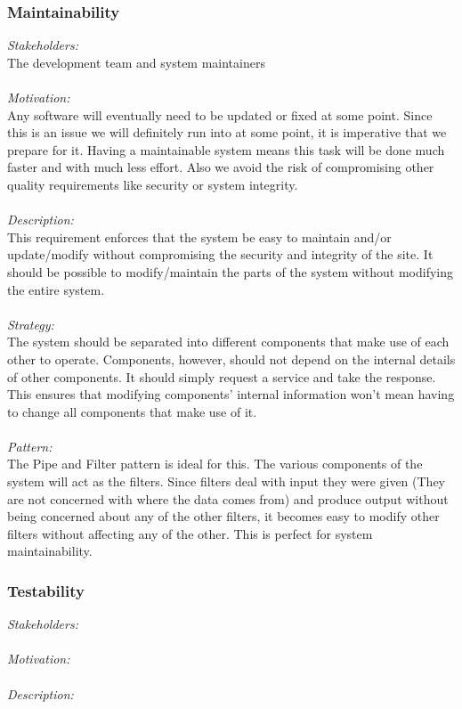 \documentclass[a4paper,12pt]{report}
\begin{document}
		\subsubsection{Maintainability}
		\emph{Stakeholders: }\\ The development team and system maintainers \\ 
		\\\emph{Motivation: }\\ Any software will eventually need to be updated or fixed at some point. Since this is an issue we will definitely run into at some point, it is imperative that we prepare for it. Having a maintainable system means this task will be done much faster and with much less effort. Also we avoid the risk of compromising other quality requirements like security or system integrity. \\ 
		\\\emph{Description: }\\ This requirement enforces that the system be easy to maintain and/or update/modify without compromising the security and integrity of the site. It should be possible to modify/maintain the parts of the system without modifying the entire system. \\ 
		\\\emph{Strategy: }\\ The system should be separated into different components that make use of each other to operate. Components, however, should not depend on the internal details of other components. It should simply request a service and take the response. This ensures that modifying components’ internal information won’t mean having to change all components that make use of it. \\
		\\\emph{Pattern: }\\ The Pipe and Filter pattern is ideal for this. The various components of the system will act as the filters. Since filters deal with input they were given (They are not concerned with where the data comes from) and produce output without being concerned about any of the other filters, it becomes easy to modify other filters without affecting any of the other. This is perfect for system maintainability.		
			
		\subsubsection{Testability}
		\emph{Stakeholders: }\\ 
		\\\emph{Motivation: }\\
		\\\emph{Description: }\\
\end{document}
